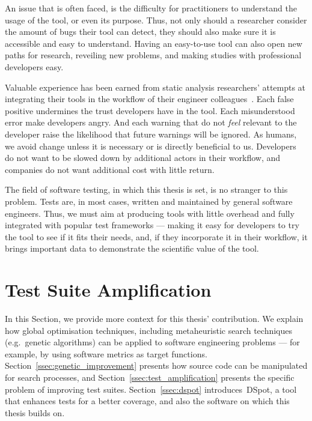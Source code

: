 \documentclass[a4paper,11pt]{sdm_internship}
\newcommand{\dspot}{DSpot\xspace}
\theoremstyle{definition}
\begin{document}
An issue that is often faced, is the difficulty for practitioners to understand the usage of the tool, or even its purpose.
Thus, not only should a researcher consider the amount of bugs their tool can detect, they should also make sure it is accessible and easy to understand.
Having an easy-to-use tool can also open new paths for research, reveiling new problems, and making studies with professional developers easy.

Valuable experience has been earned from static analysis researchers' attempts at integrating their tools in the workflow of their engineer colleagues~\cite{bessey2010few,sadowski2015tricorder,sadowski2018lessons}.
Each false positive undermines the trust developers have in the tool.
Each misunderstood error make developers angry.
And each warning that do not \emph{feel} relevant to the developer raise the likelihood that future warnings will be ignored.
As humans, we avoid change unless it is necessary or is directly beneficial to us.
Developers do not want to be slowed down by additional actors in their workflow, and companies do not want additional cost with little return.

The field of software testing, in which this thesis is set, is no stranger to this problem.
Tests are, in most cases, written and maintained by general software engineers.
Thus, we must aim at producing tools with little overhead and fully integrated with popular test frameworks --- making it easy for developers to try the tool to see if it fits their needs, and, if they incorporate it in their workflow, it brings important data to demonstrate the scientific value of the tool.


\section{Test Suite Amplification}%
\label{sec:test_suite_amplification}
In this Section, we provide more context for this thesis' contribution.
We explain how global optimisation techniques, including metaheuristic search techniques (e.g.\ genetic algorithms) can be applied to software engineering problems --- for example, by using software metrics as target functions.
Section~\ref{ssec:genetic_improvement} presents how source code can be manipulated for search processes, and Section~\ref{ssec:test_amplification} presents the specific problem of improving test suites.
Section~\ref{ssec:dspot} introduces~\dspot{}, a tool that enhances tests for a better coverage, and also the software on which this thesis builds on.
\end{document}
